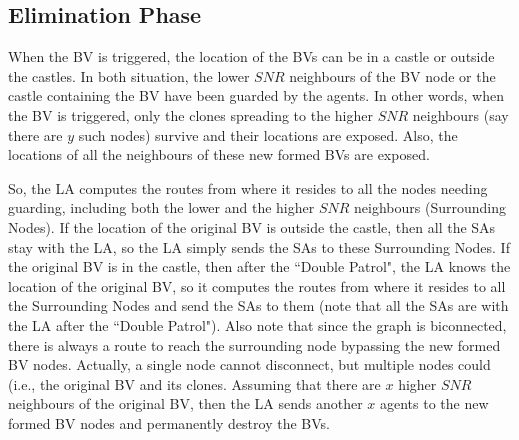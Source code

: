 \subsection{ Elimination Phase}

When the BV is triggered,   the location of the BVs can be in a castle or outside the castles. In both situation, the lower $SNR$ neighbours of the BV node or the castle containing the BV have been guarded by the agents. In other words, when the BV is triggered, only the clones spreading to the higher $SNR$ neighbours (say there are $y$ such nodes) survive and their locations are exposed. Also, the locations of all the neighbours of these new formed BVs are exposed. 

So, the LA computes the routes from where it resides to all the nodes needing guarding, including both  the lower and the higher $SNR$ neighbours   (Surrounding Nodes). If the location of the original BV is outside the castle, then all the SAs stay  with the LA, so the LA simply sends the SAs to these Surrounding Nodes. If the original BV is in the castle, then after the  ``Double Patrol", the LA knows the location of the original BV, so it computes the routes from where it resides to all the Surrounding Nodes and send the SAs to them (note that all the SAs are with the LA after the  ``Double Patrol"). Also note that since the graph is biconnected, there is always a route to reach the surrounding node    bypassing the new formed BV nodes. 
\color{blue}
Actually, a single node cannot disconnect, but multiple nodes could (i.e., the original BV and its clones.
\color{black}
Assuming that there are $x$ higher $SNR$ neighbours of the original BV, then   the LA sends another $x$ agents to the new formed BV nodes and permanently destroy the BVs.
   


  









































 